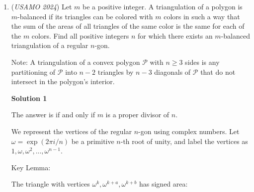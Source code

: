 \begin{enumerate}
 The last part is to expand this to what we defined an encoded sequence to be, particularly $x \in \bigcap_{S_i \in T} S_i  \iff T \subseteq \operatorname{supp}(E(x))$ by the definition of $E$. However, we established that because $\mathbf{1}(E(x))= |\operatorname{supp}(E(x))| = |T|$, it is given that $T= \operatorname{supp}(E(x))$, which is what we desired. $\blacksquare$

 \textbf{2024 USAMO P2:}

 In the encoded sequence, we choose 50 to be 1 and the rest 0, in $\binom{100}{50}$ ways.

 At this minimality,  all elements of this set share the support set that contains $\sum \mathbf{1}(x) = 50$. Thus the minimum number of elements in every given passage is 50, yielding the minimalist value $50 \binom{100}{50}$.

 By \textbf{Lemma}, there is a bijection, and thus, the count is $\boxed{50 \binom{100}{50}} \qquad \square$.

 \textbf{Remark:} 

 Solution 1 contains much handwaving and cannot be deemed a proper proof, which is why I created this.

 


	\item (\textit{USAMO 2024}) Let $m$ be a positive integer. A triangulation of a polygon is $m$-balanced if its triangles can be colored with $m$ colors in such a way that the sum of the areas of all triangles of the same color is the same for each of the $m$ colors. Find all positive integers $n$ for which there exists an $m$-balanced triangulation of a regular $n$-gon.


 Note: A triangulation of a convex polygon $\mathcal{P}$ with $n \geq 3$ sides is any partitioning of $\mathcal{P}$ into $n-2$ triangles by $n-3$ diagonals of $\mathcal{P}$ that do not intersect in the polygon's interior.


 



\textbf{Solution 1}

The answer is if and only if $m$ is a proper divisor of $n$.

 We represent the vertices of the regular $n$-gon using complex numbers. Let $\omega = \exp(2\pi i/n)$ be a primitive $n$-th root of unity, and label the vertices as $1, \omega, \omega^2, \ldots, \omega^{n-1}$.

 Key Lemma:

 The triangle with vertices $\omega^k, \omega^{k+a}, \omega^{k+b}$ has signed area:


\end{enumerate}
